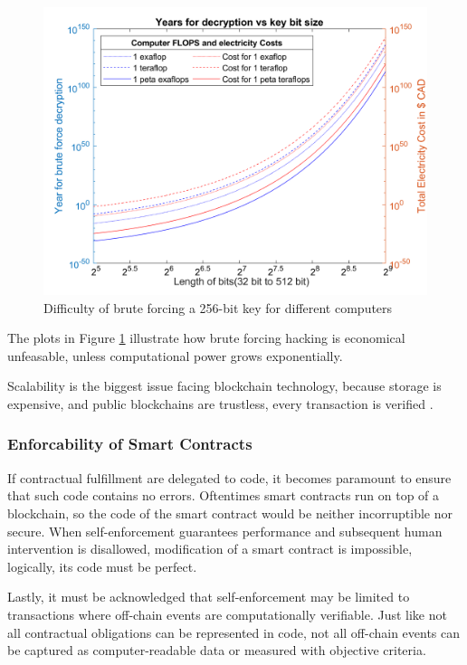  	\begin{figure}[ht]
  	\centering 
  	\includegraphics[width=0.7\linewidth]{Diagrams/epicPic.png}
  	\caption{Difficulty of brute forcing a 256-bit key for different computers}
  	\label{security:fig2}
  	\end{figure}

The plots in Figure \ref{security:fig2} illustrate how brute forcing hacking is economical unfeasable, unless computational power grows exponentially.

Scalability is the biggest issue facing \gls{blockchain} technology, because storage is expensive, and public blockchains are trustless, every transaction is verified \cite{EthScale:Online}. 

\subsubsection{Enforcability of Smart Contracts}


If contractual fulfillment are delegated to code, it becomes paramount to
ensure that such code contains no errors.  Oftentimes \glspl{smart contract} run on top of a \gls{blockchain}, so the code of the smart contract would be neither incorruptible nor secure. When self-enforcement guarantees performance and subsequent human intervention is disallowed, modification of a  smart contract is impossible, logically, its
code must be perfect. 

Lastly, it must be acknowledged that self-enforcement may be limited to transactions
where off-chain events are computationally verifiable. Just like not all contractual
obligations can be represented in code, not all off-chain events can be captured as
computer-readable data or measured with objective criteria. 


